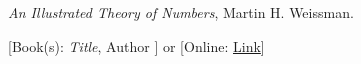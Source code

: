 \documentclass[11pt]{article}
\theoremstyle{plain}
\theoremstyle{definition}
\theoremstyle{remark}
\numberwithin{equation}{problem}
\begin{document}
\begin{thebibliography}{9}  %
\emph{An Illustrated Theory of Numbers}, Martin H. Weissman.

[Book(s): \emph{Title}, Author ] or [Online: \href{http://example.com/}{Link}]
\end{thebibliography}  %
\end{document}
